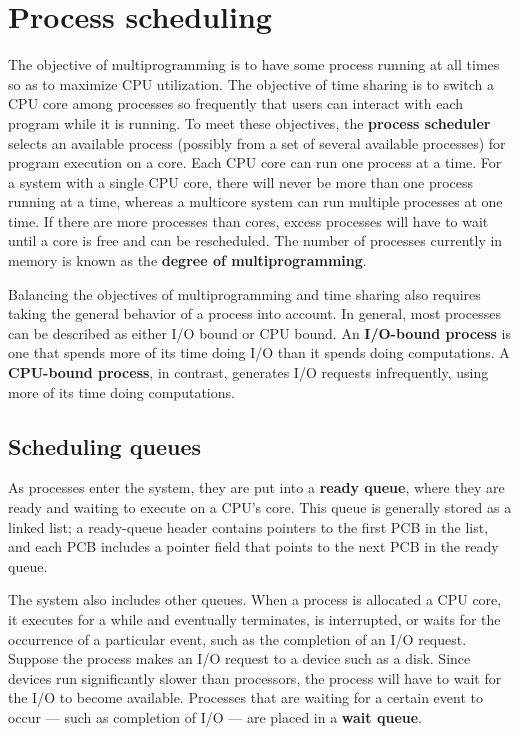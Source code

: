 \section{Process scheduling}\label{sec:3.2}

The objective of multiprogramming is to have some process running at all times so as to maximize CPU utilization. The objective of time sharing is to switch a CPU core among processes so frequently that users can interact with each program while it is running. To meet these objectives, the \textbf{process scheduler} selects an available process (possibly from a set of several available processes) for program execution on a core. Each CPU core can run one process at a time. For a system with a single CPU core, there will never be more than one process running at a time, whereas a multicore system can run multiple processes at one time. If there are more processes than cores, excess processes will have to wait until a core is free and can be rescheduled. The number of processes currently in memory is known as the \textbf{degree of multiprogramming}.

Balancing the objectives of multiprogramming and time sharing also requires taking the general behavior of a process into account. In general, most processes can be described as either I/O bound or CPU bound. An \textbf{I/O-bound process} is one that spends more of its time doing I/O than it spends doing computations. A \textbf{CPU-bound process}, in contrast, generates I/O requests infrequently, using more of its time doing computations.

\subsection*{Scheduling queues}\label{sec:3.2:scheduling_queues}
As processes enter the system, they are put into a \textbf{ready queue}, where they are ready and waiting to execute on a CPU's core. This queue is generally stored as a linked list; a ready-queue header contains pointers to the first PCB in the list, and each PCB includes a pointer field that points to the next PCB in the ready queue.

The system also includes other queues. When a process is allocated a CPU core, it executes for a while and eventually terminates, is interrupted, or waits for the occurrence of a particular event, such as the completion of an I/O request. Suppose the process makes an I/O request to a device such as a disk. Since devices run significantly slower than processors, the process will have to wait for the I/O to become available. Processes that are waiting for a certain event to occur --- such as completion of I/O --- are placed in a \textbf{wait queue}.

